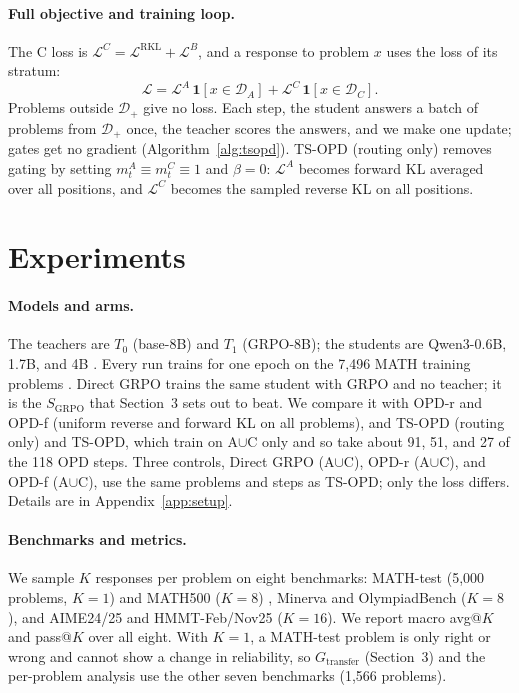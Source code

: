 \documentclass[10pt]{article}
\makeatletter
\newcommand{\avgk}{avg@$K$}
\newcommand{\passk}{pass@$K$}
\newcommand{\tsopd}{TS-OPD}
\newcommand{\tsro}{TS-OPD (routing only)}
\newcommand{\AC}{A$\cup$C}
\newcommand{\Gt}{G_{\mathrm{transfer}}}
\makeatother
\begin{document}
\paragraph{Full objective and training loop.}\label{sec:objective} The C loss is
$\mathcal L^C=\mathcal L^{\mathrm{RKL}}+\mathcal L^B$, and a response to problem $x$
uses the loss of its stratum:
\begin{equation}
\mathcal L=\mathcal L^A\,\mathbf 1[x\in\mathcal D_A]+\mathcal L^C\,\mathbf 1[x\in\mathcal D_C].
\label{eq:full}
\end{equation}
Problems outside $\mathcal D_+$ give no loss. Each step, the student answers a batch of problems from
$\mathcal D_+$ once, the teacher scores the answers, and we make one update;
gates get no gradient (Algorithm~\ref{alg:tsopd}). \tsro{} removes gating by
setting $m^A_t\equiv m^C_t\equiv1$ and $\beta=0$: $\mathcal L^A$ becomes forward
KL averaged over all positions, and $\mathcal L^C$ becomes the sampled reverse KL
on all positions.


\section{Experiments}
\label{sec:experiments}

\paragraph{Models and arms.} The teachers are $T_0$ (base-8B) and $T_1$
(GRPO-8B); the students are Qwen3-0.6B, 1.7B, and 4B \citep{yang2025qwen3}.
Every run trains for one epoch on the 7{,}496 MATH training problems
\citep{hendrycks2021math}. Direct GRPO trains the same student with GRPO and no
teacher; it is the $S_{\mathrm{GRPO}}$ that Section~3 sets out to beat. We
compare it with OPD-r and OPD-f (uniform reverse and forward KL on all
problems), and \tsro{} and \tsopd{}, which train on \AC{} only and so take about
91, 51, and 27 of the 118 OPD steps. Three controls, Direct GRPO (\AC), OPD-r
(\AC), and OPD-f (\AC), use the same problems and steps as \tsopd{}; only the
loss differs. Details are in Appendix~\ref{app:setup}.

\paragraph{Benchmarks and metrics.} We sample $K$ responses per problem on eight
benchmarks: MATH-test (5{,}000 problems, $K=1$) and MATH500 ($K=8$)
\citep{hendrycks2021math,lightman2023verify}, Minerva
\citep{lewkowycz2022minerva} and OlympiadBench \citep{he2024olympiadbench}
($K=8$), and AIME24/25 \citep{aopsAimeArchive} and HMMT-Feb/Nov25
\citep{hmmt2025february,hmmt2025november} ($K=16$). We report macro \avgk{} and
\passk{} over all eight. With $K=1$, a MATH-test problem is only right or wrong
and cannot show a change in reliability, so $\Gt$ (Section~3) and the
per-problem analysis use the other seven benchmarks (1{,}566 problems).
\end{document}
